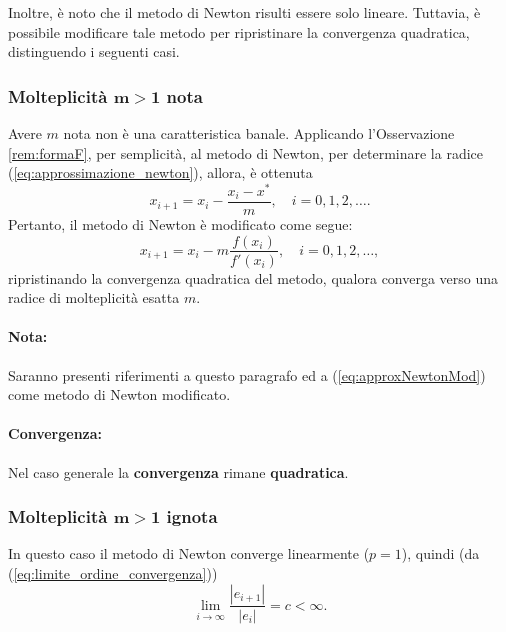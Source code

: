 Inoltre, è noto che il metodo di Newton risulti essere solo lineare. Tuttavia, è possibile modificare tale metodo per ripristinare la convergenza quadratica, distinguendo i seguenti casi.

\subsubsection{Molteplicità \texorpdfstring{$\boldsymbol{m>1}$}{m>1} nota}
Avere $m$ nota non è una caratteristica banale. Applicando l'Osservazione \ref{rem:formaF}, per semplicità, al metodo di Newton, per determinare la radice (\ref{eq:approssimazione_newton}), allora, è ottenuta
\begin{equation*}
	x_{i+1}=x_i-\frac{x_i-x^*}{m}, \quad i=0,1,2,\hdots.
\end{equation*}
Pertanto, il metodo di Newton è modificato come segue:
\begin{equation}\label{eq:approxNewtonMod}
	x_{i+1}=x_i-m\frac{f(x_i)}{f'(x_i)}, \quad i=0,1,2,\hdots,
\end{equation}
ripristinando la convergenza quadratica del metodo, qualora converga verso una radice di molteplicità esatta $m$.

\paragraph{Nota:} Saranno presenti riferimenti a questo paragrafo ed a (\ref{eq:approxNewtonMod}) come metodo di Newton modificato.

\paragraph{Convergenza:} Nel caso generale la \textbf{convergenza} rimane \textbf{quadratica}.

\subsubsection{Molteplicità \texorpdfstring{$\boldsymbol{m>1}$}{m>1} ignota}
In questo caso il metodo di Newton converge linearmente ($p=1$), quindi (da (\ref{eq:limite_ordine_convergenza}))
\begin{equation*}
	\underset{i\to\infty}{\lim}{\frac{|e_{i+1}|}{|e_i|}} = c<\infty.
\end{equation*}

